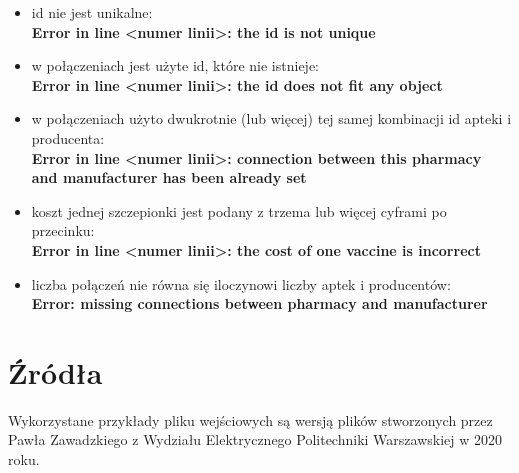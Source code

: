 \documentclass[10pt,a4paper]{article}
\begin{document}
\begin{itemize}
\item id nie jest unikalne: \\ \textbf{Error in line \textless numer linii\textgreater : the id is not unique }
\item w połączeniach jest użyte id, które nie istnieje: \\ \textbf{Error in line \textless numer linii\textgreater: the id does not fit any object}
\item w połączeniach użyto dwukrotnie (lub więcej) tej samej kombinacji id apteki i producenta: \\ \textbf{Error in line \textless numer linii\textgreater : connection between this pharmacy and manufacturer has been already set}
\item koszt jednej szczepionki jest podany z trzema lub więcej cyframi po przecinku: \\ \textbf{Error in line \textless numer linii\textgreater: the cost of one vaccine is incorrect}
\item liczba połączeń nie równa się iloczynowi liczby aptek i producentów: \\ \textbf{Error: missing connections between pharmacy and manufacturer}
\end{itemize}

\section{Źródła}
Wykorzystane przykłady pliku wejściowych są wersją plików stworzonych przez Pawła Zawadzkiego z Wydziału Elektrycznego Politechniki Warszawskiej w 2020 roku.
\end{document}
